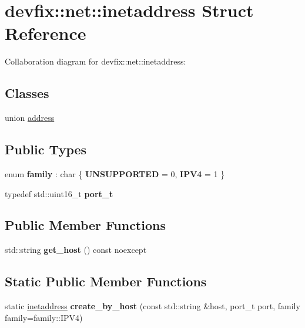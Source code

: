 \hypertarget{structdevfix_1_1net_1_1inetaddress}{}\section{devfix\+:\+:net\+:\+:inetaddress Struct Reference}
\label{structdevfix_1_1net_1_1inetaddress}


Collaboration diagram for devfix\+:\+:net\+:\+:inetaddress\+:
\subsection*{Classes}
\begin{DoxyCompactItemize}
\item 
union \hyperlink{uniondevfix_1_1net_1_1inetaddress_1_1address}{address}
\end{DoxyCompactItemize}
\subsection*{Public Types}
\begin{DoxyCompactItemize}
\item 
\mbox{\label{structdevfix_1_1net_1_1inetaddress_a31ec66f69260c75bfa5105d8e042ff06}} 
enum {\bfseries family} \+: char \{ {\bfseries U\+N\+S\+U\+P\+P\+O\+R\+T\+ED} = 0, 
{\bfseries I\+P\+V4} = 1
 \}
\item 
\mbox{\label{structdevfix_1_1net_1_1inetaddress_a3eaadc730f2b4625987cf948ea485410}} 
typedef std\+::uint16\+\_\+t {\bfseries port\+\_\+t}
\end{DoxyCompactItemize}
\subsection*{Public Member Functions}
\begin{DoxyCompactItemize}
\item 
\mbox{\label{structdevfix_1_1net_1_1inetaddress_a4524692fae7a767e38600012c6f8f3cf}} 
std\+::string {\bfseries get\+\_\+host} () const noexcept
\end{DoxyCompactItemize}
\subsection*{Static Public Member Functions}
\begin{DoxyCompactItemize}
\item 
\mbox{\label{structdevfix_1_1net_1_1inetaddress_a1805a7f56b3c4313232293580b052c7c}} 
static \hyperlink{structdevfix_1_1net_1_1inetaddress}{inetaddress} {\bfseries create\+\_\+by\+\_\+host} (const std\+::string \&host, port\+\_\+t port, family family=family\+::\+I\+P\+V4)
\end{DoxyCompactItemize}
